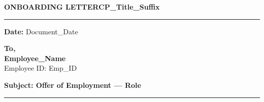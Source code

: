 \documentclass[9.5pt]{article}
\begin{document}
\vspace*{18pt}

{\fontsize{14pt}{17pt}\selectfont\bfseries\color{t2ldark}%
  ONBOARDING LETTER{{CP_Title_Suffix}}%
}\par\vspace{2pt}
{\color{refgold}\rule{\linewidth}{1pt}}\par\vspace{7pt}

{\fontsize{9.5pt}{13pt}\selectfont\color{refcharcoal}%
  \textbf{Date:} {{Document_Date}}\par\vspace{4pt}%
  \textbf{To,}\\[1pt]\textbf{{{Employee_Name}}}\\Employee ID: {{Emp_ID}}%
}\par\vspace{6pt}

{\fontsize{9.5pt}{12.5pt}\selectfont\bfseries\color{t2ldark}%
  Subject: Offer of Employment --- {{Role}}%
}\par
{\color{refgold}\rule{0.36\linewidth}{0.6pt}}\par\vspace{7pt}
\end{document}
